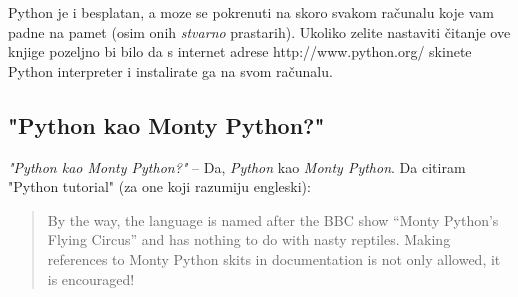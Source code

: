 	Python je i besplatan, a moze se pokrenuti na skoro svakom računalu koje
	vam padne na pamet (osim onih \emph{stvarno} prastarih). Ukoliko zelite
	nastaviti čitanje ove knjige pozeljno bi bilo da s internet adrese
	http://www.python.org/ skinete Python interpreter i instalirate ga na svom
	računalu.

\subsection{"Python kao Monty Python?"}

	\emph{"Python kao Monty Python?"} -- Da, \emph{Python} kao \emph{Monty Python}. Da
	citiram "Python tutorial" (za one koji razumiju engleski):

	\begin{quote}
	By the way, the language is named after the BBC show ``Monty Python's
	Flying Circus'' and has nothing to do with nasty reptiles.  Making
	references to Monty Python skits in documentation is not only allowed,
	it is encouraged!
	\end{quote}

